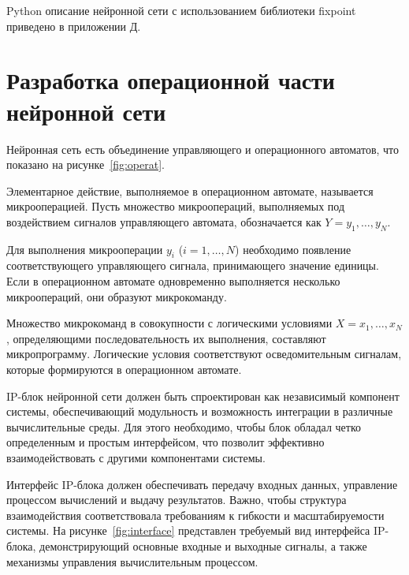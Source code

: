 Python описание нейронной сети с использованием библиотеки fixpoint приведено в
приложении Д.

\section{Разработка операционной части нейронной сети}
\hspace*{12.5 mm}Нейронная сеть есть объединение управляющего и операционного
автоматов, что показано на рисунке~\ref{fig:operat}. 


Элементарное действие, выполняемое в операционном автомате, называется 
микрооперацией. Пусть множество микроопераций, выполняемых под воздействием 
сигналов управляющего автомата, обозначается как \( Y = y_1, \dots, y_N\).  

Для выполнения микрооперации \( y_i \) (\( i = 1, \dots, N \)) необходимо 
появление соответствующего управляющего сигнала, принимающего значение единицы. 
Если в операционном автомате одновременно выполняется несколько микроопераций, 
они образуют микрокоманду.  

Множество микрокоманд в совокупности с логическими условиями 
\(X = x_1, \dots, x_N \), определяющими последовательность их выполнения, 
составляют микропрограмму. Логические условия соответствуют осведомительным 
сигналам, которые формируются в операционном автомате.

IP-блок нейронной сети должен быть спроектирован как независимый компонент 
системы, обеспечивающий модульность и возможность интеграции в различные 
вычислительные среды. Для этого необходимо, чтобы блок обладал четко 
определенным и простым интерфейсом, что позволит эффективно взаимодействовать 
с другими компонентами системы.

Интерфейс IP-блока должен обеспечивать передачу входных данных, управление 
процессом вычислений и выдачу результатов. Важно, чтобы структура 
взаимодействия соответствовала требованиям к гибкости и масштабируемости 
системы. На рисунке~\ref{fig:interface} представлен требуемый вид интерфейса 
IP-блока, демонстрирующий основные входные и выходные сигналы, а также 
механизмы управления вычислительным процессом.

